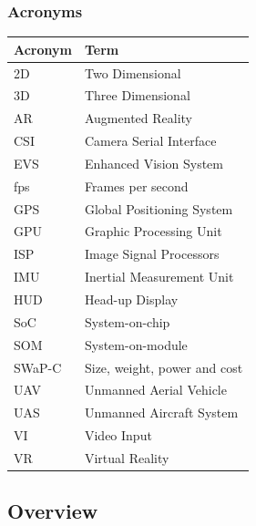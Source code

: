 \documentclass[letterpaper,10pt,serif,draftclsnofoot,onecolumn,compsoc,titlepage]{IEEEtran}
\begin{document}
\subsubsection{Acronyms}

\begin{tabular}{|l|l|}
	\hline
	\textbf{Acronym} & \textbf{Term}\\
	\hline
	2D & Two Dimensional\\
	\hline
	3D & Three Dimensional\\
	\hline
	AR & Augmented Reality\\
	\hline
	CSI & Camera Serial Interface\\
	\hline
	EVS & Enhanced Vision System\\
	\hline
	fps & Frames per second\\
	\hline
	GPS & Global Positioning System\\
	\hline
	GPU & Graphic Processing Unit\\
	\hline
	ISP & Image Signal Processors\\
	\hline
	IMU & Inertial Measurement Unit\\
	\hline
	HUD & Head-up Display\\
	\hline
	SoC & System-on-chip\\
	\hline
	SOM & System-on-module\\
	\hline
	SWaP-C & Size, weight, power and cost\\
	\hline
	UAV & Unmanned Aerial Vehicle\\
	\hline
	UAS & Unmanned Aircraft System\\
	\hline
	VI & Video Input\\
	\hline
	VR & Virtual Reality\\
	\hline
\end{tabular}





\subsection{Overview}
\end{document}
